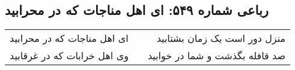 \begin{center}
\section*{رباعی شماره ۵۴۹: ای اهل مناجات که در محرابید}
\label{sec:0549}
\begin{longtable}{l p{0.5cm} r}
ای اهل مناجات که در محرابید
&&
منزل دور است یک زمان بشتابید
\\
وی اهل خرابات که در غرقابید
&&
صد قافله بگذشت و شما در خوابید
\\
\end{longtable}
\end{center}
